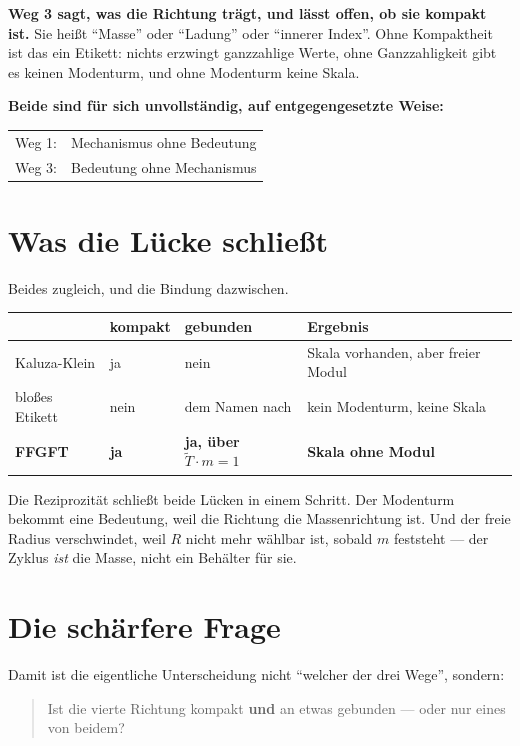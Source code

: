 \documentclass[11pt]{report}
\begin{document}
\textbf{Weg 3 sagt, was die Richtung trägt, und lässt offen, ob sie
kompakt ist.} Sie heißt \enquote{Masse} oder \enquote{Ladung} oder
\enquote{innerer Index}. Ohne Kompaktheit ist das ein Etikett: nichts
erzwingt ganzzahlige Werte, ohne Ganzzahligkeit gibt es keinen
Modenturm, und ohne Modenturm keine Skala.

\textbf{Beide sind für sich unvollständig, auf entgegengesetzte
Weise:}
\begin{center}
\begin{tabular}{ll}
Weg 1: & Mechanismus ohne Bedeutung \\
Weg 3: & Bedeutung ohne Mechanismus \\
\end{tabular}
\end{center}

\section{Was die Lücke schließt}

Beides zugleich, und die Bindung dazwischen.

\begin{center}
\begin{tabular}{lllp{4.6cm}}
\toprule
 & kompakt & gebunden & Ergebnis \\
\midrule
Kaluza-Klein & ja & nein & Skala vorhanden, aber freier Modul \\
bloßes Etikett & nein & dem Namen nach & kein Modenturm, keine Skala \\
\textbf{FFGFT} & \textbf{ja} & \textbf{ja, über $\tilde T \cdot m = 1$}
  & \textbf{Skala ohne Modul} \\
\bottomrule
\end{tabular}
\end{center}

Die Reziprozität schließt beide Lücken in einem Schritt. Der Modenturm
bekommt eine Bedeutung, weil die Richtung die Massenrichtung ist. Und
der freie Radius verschwindet, weil $R$ nicht mehr wählbar ist, sobald
$m$ feststeht --- der Zyklus \emph{ist} die Masse, nicht ein Behälter
für sie.

\section{Die schärfere Frage}

Damit ist die eigentliche Unterscheidung nicht \enquote{welcher der
drei Wege}, sondern:

\begin{quote}
Ist die vierte Richtung kompakt \textbf{und} an etwas gebunden --- oder
nur eines von beidem?
\end{quote}
\end{document}
